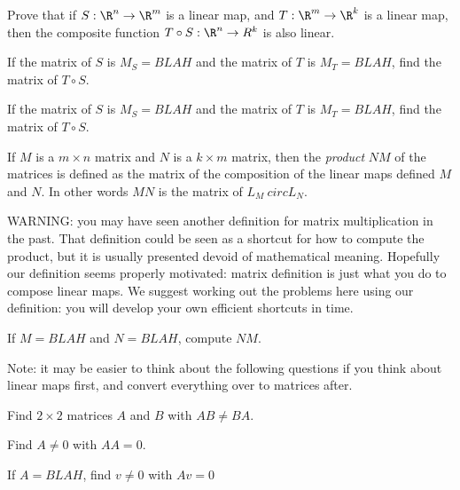 	\begin{question}
		Prove that if $S:\R^n \to \R^m$ is a linear map, and $T:\R^m \to \R^k$ is a linear map, then the composite function $T\circ S:\R^n \to R^k$ is also linear.
	\end{question}
	
	\begin{question}
		If the matrix of $S$ is $M_S = BLAH$ and the matrix of $T$ is $M_T = BLAH$, find the matrix of $T \circ S$.
	\end{question}
	
	\begin{question}
		If the matrix of $S$ is $M_S = BLAH$ and the matrix of $T$ is $M_T = BLAH$, find the matrix of $T \circ S$.
	\end{question}
	
	\begin{definition}
		If $M$ is a $m\times n$ matrix and $N$ is a $k \times m$ matrix, then the \textit{product} $NM$ of the matrices is
		defined as the matrix of the composition of the linear maps defined $M$ and $N$.  In other words  $MN$ is the matrix of 
		$L_M\ circ L_N$.
	\end{definition}
	
	WARNING:  you may have seen another definition for matrix multiplication in the past.  That definition could be seen as a shortcut for how
	to compute the product, but it is usually presented devoid of mathematical meaning.  Hopefully our definition seems properly motivated:  matrix definition is 
	just what you do to compose linear maps.  We suggest working out the problems here using our definition:  you will develop your own efficient shortcuts in time.
	
	\begin{question}
		If $M = BLAH$ and $N=BLAH$, compute $NM$.
	\end{question}
	
	Note:  it may be easier to think about the following questions if you think about linear maps first, and convert everything over to matrices after.
	
	\begin{question}
		Find $2\times 2$ matrices $A$ and $B$ with $AB \neq BA$.
	\end{question}
	
	\begin{question}
		Find $A \neq 0$  with $AA = 0$.
	\end{question}
	
	\begin{question}
		If $A = BLAH$, find $v \neq 0$ with $Av = 0$ 
	\end{question}
	
